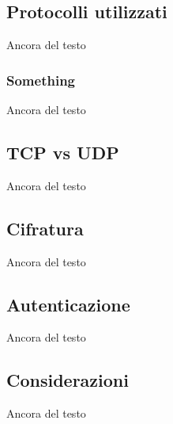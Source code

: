 \subsection{Protocolli utilizzati}
Ancora del testo

\subsubsection{Something}
Ancora del testo

\subsection{TCP vs UDP}
Ancora del testo

\subsection{Cifratura}
Ancora del testo

\subsection{Autenticazione}
Ancora del testo

\subsection{Considerazioni}
Ancora del testo